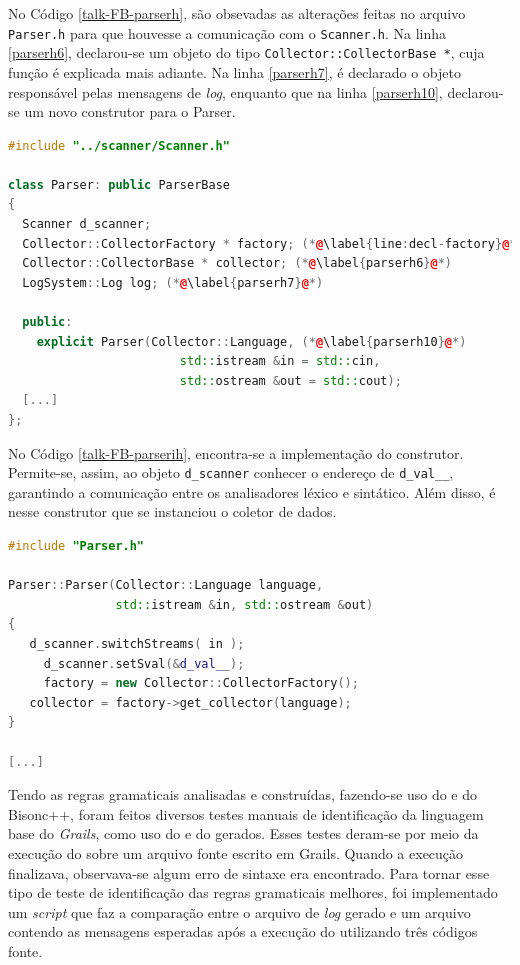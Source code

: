 No Código \ref{talk-FB-parserh}, são obsevadas as alterações feitas no arquivo
\lstinline|Parser.h| para que houvesse a comunicação com o \lstinline|Scanner.h|.
Na linha \ref{parserh6}, declarou-se um objeto do tipo
\lstinline|Collector::CollectorBase *|, cuja função é explicada mais adiante.
Na linha \ref{parserh7}, é declarado o objeto responsável pelas mensagens de
\textit{log}, enquanto que na linha \ref{parserh10}, declarou-se um novo
construtor para o Parser.
\begin{lstlisting}[language=C++, label=talk-FB-parserh, caption=Alterações no Parser.h para comunicação entre analisadores léxico e sintático]
#include "../scanner/Scanner.h"

class Parser: public ParserBase
{
  Scanner d_scanner;
  Collector::CollectorFactory * factory; (*@\label{line:decl-factory}@*)
  Collector::CollectorBase * collector; (*@\label{parserh6}@*)
  LogSystem::Log log; (*@\label{parserh7}@*)

  public:
    explicit Parser(Collector::Language, (*@\label{parserh10}@*)
    					std::istream &in = std::cin,
    					std::ostream &out = std::cout);
  [...]
};
\end{lstlisting}

No Código \ref{talk-FB-parserih}, encontra-se a implementação do construtor.
Permite-se, assim, ao objeto \lstinline|d_scanner| conhecer o endereço
de \lstinline|d_val__|, garantindo a comunicação entre os analisadores léxico e
sintático. Além disso, é nesse construtor que se instanciou o coletor de
dados.
\begin{lstlisting}[language=C++, label=talk-FB-parserih, caption=Alterações no Parser.ih para comunicação entre analisadores léxico e sintático]
#include "Parser.h"

Parser::Parser(Collector::Language language,
			   std::istream &in, std::ostream &out)
{
   d_scanner.switchStreams( in );
	 d_scanner.setSval(&d_val__);
	 factory = new Collector::CollectorFactory();
   collector = factory->get_collector(language);
}

[...]
\end{lstlisting}

Tendo as regras gramaticais analisadas e construídas, fazendo-se uso
do \flexcpp e do \textsf{Bisonc++}, foram feitos diversos testes manuais
de identificação da linguagem base do \textit{Grails}, como uso do \parser e do \scanner
gerados. Esses testes deram-se por meio da execução do \parser sobre um
arquivo fonte escrito em \textsf{Grails}. Quando a execução finalizava,
observava-se algum erro de sintaxe era encontrado. Para tornar esse
tipo de teste de identificação das regras gramaticais melhores, foi
implementado um \textit{script} que faz a comparação entre o arquivo de
\textit{log} gerado e um arquivo contendo as mensagens esperadas após
a execução do \parser utilizando três códigos fonte.

